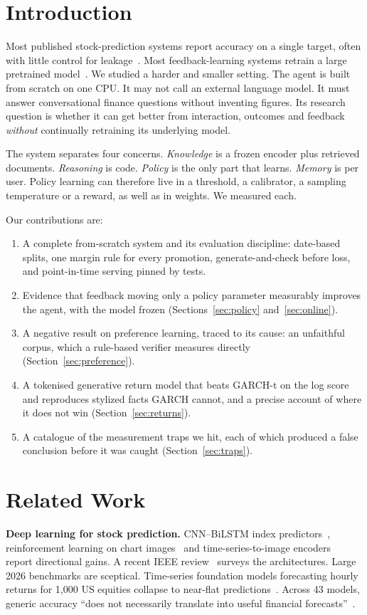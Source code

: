 \documentclass[conference]{IEEEtran}
\begin{document}
\section{Introduction}
Most published stock-prediction systems report accuracy on a single target, often with little
control for leakage~\cite{Eapen_2019,Lee_2019,Barra_2020}. Most feedback-learning systems retrain a
large pretrained model~\cite{Lin_2020,Wong_2024,rafailov2023dpo}. We studied a harder and smaller
setting. The agent is built from scratch on one CPU. It may not call an external language model. It
must answer conversational finance questions without inventing figures. Its research question is
whether it can get better from interaction, outcomes and feedback \emph{without} continually
retraining its underlying model.

The system separates four concerns. \emph{Knowledge} is a frozen encoder plus retrieved documents.
\emph{Reasoning} is code. \emph{Policy} is the only part that learns. \emph{Memory} is per user.
Policy learning can therefore live in a threshold, a calibrator, a sampling temperature or a reward,
as well as in weights. We measured each.

Our contributions are:
\begin{enumerate}
\item A complete from-scratch system and its evaluation discipline: date-based splits, one margin
rule for every promotion, generate-and-check before loss, and point-in-time serving pinned by tests.
\item Evidence that feedback moving only a policy parameter measurably improves the agent, with the
model frozen (Sections~\ref{sec:policy} and~\ref{sec:online}).
\item A negative result on preference learning, traced to its cause: an unfaithful corpus, which a
rule-based verifier measures directly (Section~\ref{sec:preference}).
\item A tokenised generative return model that beats GARCH-t on the log score and reproduces stylized
facts GARCH cannot, and a precise account of where it does not win (Section~\ref{sec:returns}).
\item A catalogue of the measurement traps we hit, each of which produced a false conclusion
before it was caught (Section~\ref{sec:traps}).
\end{enumerate}

\section{Related Work}
\textbf{Deep learning for stock prediction.} CNN--BiLSTM index predictors~\cite{Eapen_2019},
reinforcement learning on chart images~\cite{Lee_2019} and time-series-to-image
encoders~\cite{Barra_2020} report directional gains. A recent IEEE review~\cite{Li_2024} surveys the
architectures. Large 2026 benchmarks are sceptical. Time-series foundation models forecasting hourly
returns for 1{,}000 US equities collapse to near-flat predictions~\cite{collapse2026}. Across 43
models, generic accuracy ``does not necessarily translate into useful financial
forecasts''~\cite{finverse2026}.
\end{document}
